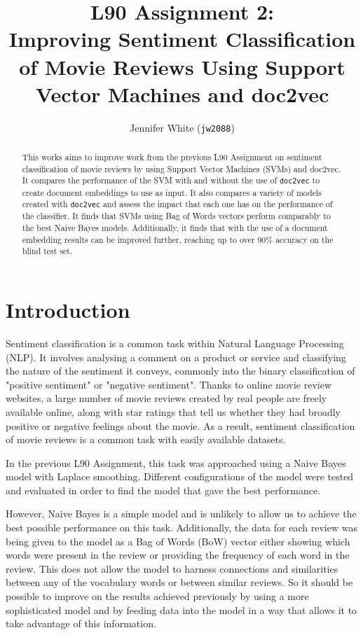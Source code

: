 \documentclass[twocolumn]{article}
\title{ L90 Assignment 2:\\
	Improving Sentiment Classification of Movie Reviews Using Support Vector Machines and doc2vec }
\author{Jennifer White (\texttt{jw2088})}
\date{}
\begin{document}
\maketitle
\begin{abstract}
This works aims to improve work from the previous L90 Assignment on sentiment classification of movie reviews by using Support Vector Machines (SVMs) and doc2vec. It compares the performance of the SVM with and without the use of \texttt{doc2vec} to create document embeddings to use as input. It also compares a variety of models created with \texttt{doc2vec} and assess the impact that each one has on the performance of the classifier. It finds that SVMs using Bag of Words vectors perform comparably to the best Naive Bayes models. Additionally, it finds that with the use of a document embedding results can be improved further, reaching up to over 90\% accuracy on the blind test set.
\end{abstract}

\section{Introduction}

Sentiment classification is a common task within Natural Language Processing (NLP). It involves analysing a comment on a product or service and classifying the nature of the sentiment it conveys, commonly into the binary classification of "positive sentiment" or "negative sentiment". Thanks to online movie review websites, a large number of movie reviews created by real people are freely available online, along with star ratings that tell us whether they had broadly positive or negative feelings about the movie. As a result, sentiment classification of movie reviews is a common task with easily available datasets.

In the previous L90 Assignment, this task was approached using a Naive Bayes model with Laplace smoothing. Different configurations of the model were tested and evaluated in order to find the model that gave the best performance.

However, Naive Bayes is a simple model and is unlikely to allow us to achieve the best possible performance on this task. Additionally, the data for each review was being given to the model as a Bag of Words (BoW) vector either showing which words were present in the review or providing the frequency of each word in the review. This does not allow the model to harness connections and similarities between any of the vocabulary words or between similar reviews. So it should be possible to improve on the results achieved previously by using a more sophisticated model and by feeding data into the model in a way that allows it to take advantage of this information.
\end{document}
